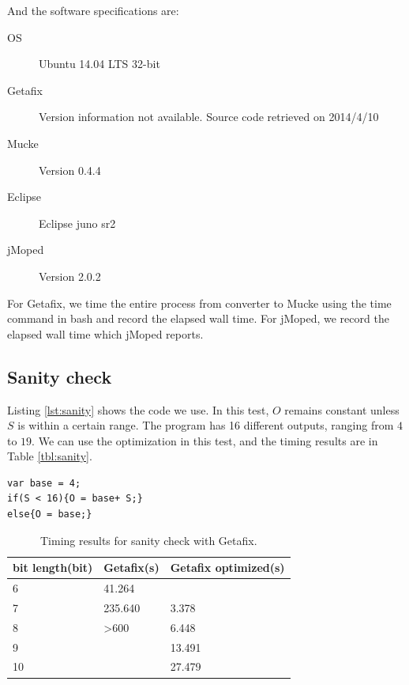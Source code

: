 And the software specifications are:
\begin{description}
  \item[OS] Ubuntu 14.04 LTS 32-bit
  \item[Getafix] Version information not available. Source code retrieved on 2014/4/10
  \item[Mucke] Version 0.4.4
  \item[Eclipse] Eclipse juno sr2
  \item[jMoped] Version 2.0.2
\end{description}

For Getafix, we time the entire process from converter to Mucke using the time command in bash and record the elapsed wall time. For jMoped, we record the elapsed wall time which jMoped reports.

\subsection{Sanity check}
Listing \ref{lst:sanity} shows the code we use. In this test, $O$ remains constant unless $S$ is within a certain range. The program has 16 different outputs, ranging from $4$ to $19$. We can use the optimization in this test, and the timing results are in Table \ref{tbl:sanity}.

\lstset{language=C}  
\begin{lstlisting}[float=!h, caption={Sanity check test program.},label=lst:sanity]
var base = 4;
if(S < 16){O = base+ S;}
else{O = base;}
\end{lstlisting}

\begin{table}[!h]
\centering
\begin{tabular}{|l|l|l|}
\hline
bit length(bit) & Getafix(s) & Getafix optimized(s)  \\ \hline
6 & 41.264 & {}  \\ \hline
7 & 235.640 & 3.378  \\ \hline
8 & \textgreater 600 & 6.448 \\ \hline
9 &  & 13.491\\ \hline
10 &  & 27.479 \\ \hline
\end{tabular}
\caption{Timing results for sanity check with Getafix.}
\label{tbl:sanityG}
\end{table}

